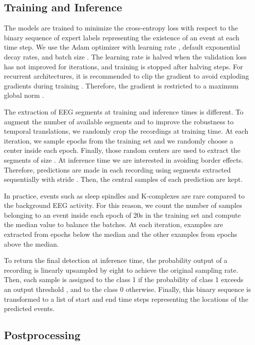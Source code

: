 \documentclass[conference]{IEEEtran}
\begin{document}
\subsection{Training and Inference}
\label{sec:train}

The models are trained to minimize the cross-entropy loss with respect to the binary sequence of expert labels representing the existence of an event at each time step. We use the Adam optimizer \cite{kingma2014adam} with learning rate , default exponential decay rates, and batch size . The learning rate is halved when the validation loss has not improved for  iterations, and training is stopped after  halving steps. For recurrent architectures, it is recommended to clip the gradient to avoid exploding gradients during training \cite{pascanu2013difficulty}. Therefore, the gradient is restricted to a maximum global norm . 

The extraction of EEG segments at training and inference times is different. To augment the number of available segments and to improve the robustness to temporal translations, we randomly crop the recordings at training time. At each iteration, we sample  epochs from the training set and we randomly choose a center inside each epoch. Finally, those random centers are used to extract the  segments of size . At inference time we are interested in avoiding border effects. Therefore, predictions are made in each recording using segments extracted sequentially with stride . Then, the central  samples of each prediction are kept.

In practice, events such as sleep spindles and K-complexes are rare compared to the background EEG activity. For this reason, we count the number of samples belonging to an event inside each epoch of 20s in the training set and compute the median value to balance the batches. At each iteration,  examples are extracted from epochs below the median and the other  examples from epochs above the median.

To return the final detection at inference time, the probability output of a recording is linearly upsampled by eight to achieve the original sampling rate. Then, each sample is assigned to the class 1 if the probability of class 1 exceeds an output threshold , and to the class 0 otherwise. Finally, this binary sequence is transformed to a list of start and end time steps representing the locations of the predicted events.

\subsection{Postprocessing}
\label{sec:postprocessing}
\end{document}
